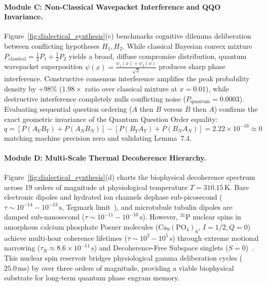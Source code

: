 \documentclass[10pt,twocolumn,3p]{article}
\begin{document}
\paragraph{Module C: Non-Classical Wavepacket Interference and QQO Invariance.}
Figure~\ref{fig:dialectical_synthesis}(c) benchmarks cognitive dilemma deliberation between conflicting hypotheses $H_1, H_2$. While classical Bayesian convex mixture $P_{\text{classical}} = \frac{1}{2} P_1 + \frac{1}{2} P_2$ yields a broad, diffuse compromise distribution, quantum wavepacket superposition $\psi(x) = \frac{\psi_1(x) + \psi_2(x)}{\sqrt{2}}$ produces sharp phase interference. Constructive consensus interference amplifies the peak probability density by $+98\%$ ($1.98\times$ ratio over classical mixture at $x = 0.01$), while destructive interference completely nulls conflicting noise ($P_{\text{quantum}} = 0.0003$). Evaluating sequential question ordering ($A$ then $B$ versus $B$ then $A$) confirms the exact geometric invariance of the Quantum Question Order equality:
\begin{equation}
    q = [P(A_Y B_Y) + P(A_N B_N)] - [P(B_Y A_Y) + P(B_N A_N)] = 2.22 \times 10^{-16} \approx 0
\end{equation}
matching machine precision zero and validating Lemma~7.4.

\paragraph{Module D: Multi-Scale Thermal Decoherence Hierarchy.}
Figure~\ref{fig:dialectical_synthesis}(d) charts the biophysical decoherence spectrum across 19 orders of magnitude at physiological temperature $T = 310.15\,\text{K}$. Bare electronic dipoles and hydrated ion channels dephase sub-picosecond ($\tau \sim 10^{-14} - 10^{-13}\,\text{s}$, Tegmark limit~\cite{tegmark2000}), and microtubule tubulin dipoles are damped sub-nanosecond ($\tau \sim 10^{-11} - 10^{-10}\,\text{s}$). However, $^{31}\text{P}$ nuclear spins in amorphous calcium phosphate Posner molecules ($\text{Ca}_9(\text{PO}_4)_6$, $I=1/2, Q=0$) achieve multi-hour coherence lifetimes ($\tau \sim 10^2 - 10^5\,\text{s}$) through extreme motional narrowing ($\tau_R \approx 8.6 \times 10^{-11}\,\text{s}$) and Decoherence-Free Subspace singlets ($S=0$)~\cite{fisher2015,swift2018}. This nuclear spin reservoir bridges physiological gamma deliberation cycles ($25.0\,\text{ms}$) by over three orders of magnitude, providing a viable biophysical substrate for long-term quantum phase engram memory.
\end{document}

